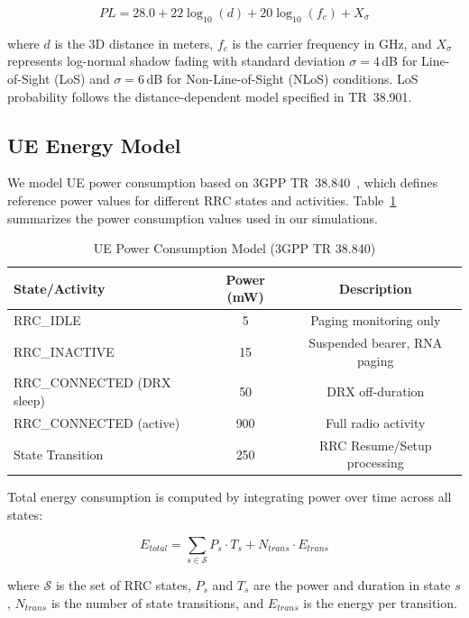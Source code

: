\documentclass[conference]{IEEEtran}
\begin{document}
\begin{equation}
    PL = 28.0 + 22\log_{10}(d) + 20\log_{10}(f_c) + X_\sigma
    \label{eq:pathloss}
\end{equation}

\noindent where $d$ is the 3D distance in meters, $f_c$ is the carrier frequency in GHz, and $X_\sigma$ represents log-normal shadow fading with standard deviation $\sigma = 4$\,dB for Line-of-Sight (LoS) and $\sigma = 6$\,dB for Non-Line-of-Sight (NLoS) conditions. LoS probability follows the distance-dependent model specified in TR~38.901.

\subsection{UE Energy Model}
\label{subsec:energy}

We model UE power consumption based on 3GPP TR~38.840~\cite{3GPPTR38840}, which defines reference power values for different RRC states and activities. Table~\ref{tab:power_model} summarizes the power consumption values used in our simulations.

\begin{table}[t]
\centering
\caption{UE Power Consumption Model (3GPP TR 38.840)}
\label{tab:power_model}
\begin{tabular}{@{}lcc@{}}
\toprule
\textbf{State/Activity} & \textbf{Power (mW)} & \textbf{Description} \\
\midrule
RRC\_IDLE & 5 & Paging monitoring only \\
RRC\_INACTIVE & 15 & Suspended bearer, RNA paging \\
RRC\_CONNECTED (DRX sleep) & 50 & DRX off-duration \\
RRC\_CONNECTED (active) & 900 & Full radio activity \\
State Transition & 250 & RRC Resume/Setup processing \\
\bottomrule
\end{tabular}
\end{table}

Total energy consumption is computed by integrating power over time across all states:

\begin{equation}
    E_{total} = \sum_{s \in \mathcal{S}} P_s \cdot T_s + N_{trans} \cdot E_{trans}
    \label{eq:energy}
\end{equation}

\noindent where $\mathcal{S}$ is the set of RRC states, $P_s$ and $T_s$ are the power and duration in state $s$, $N_{trans}$ is the number of state transitions, and $E_{trans}$ is the energy per transition.
\end{document}
